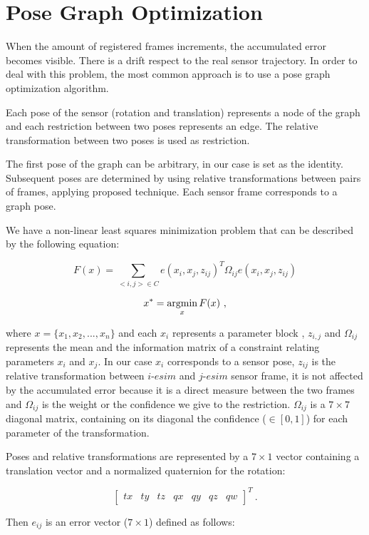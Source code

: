 \section{Pose Graph Optimization}
\label{sec:posegraph}
When the amount of registered frames increments, the accumulated error 
becomes visible. There is a drift respect to the real sensor trajectory. 
In order to deal with this problem, the most common approach is to use a pose graph 
optimization algorithm. 


Each pose of the sensor (rotation and translation) represents a node of the 
graph and each restriction between two poses represents an edge. The relative 
transformation between two poses is used as restriction.


The first pose of the graph can be arbitrary, in our case is set as the identity. Subsequent 
poses are determined by using relative transformations between pairs of frames, applying 
proposed technique. Each sensor frame corresponds to a graph pose. 

We have a non-linear least squares minimization problem that can be described by the following equation:

$$ F(x) = \sum\limits_{<i,j> \in C } e(x_i,x_j,z_{ij})^T \Omega_{ij} e(x_i,x_j,z_{ij}) $$

$$ x^* = \mathop{\rm argmin}_x F(x) \ ,$$

\noindent where $x=\{x_1,x_2,...,x_n\}$ and each $x_i$ represents a parameter block , $z_{i,j}$ and $\Omega_{ij}$ represents the mean  
 and the information matrix  of a constraint 
relating parameters $x_i$ and $x_j$. In our case $x_i$ corresponds to a sensor pose, $z_{ij}$ is the 
relative transformation between $i$-$esim$ and $j$-$esim$ sensor frame, it is not affected by the accumulated error 
because it is a direct measure between the two frames and $\Omega_{ij}$ is the weight or 
the confidence we give to the restriction. $\Omega_{ij}$ is a $7\times7$ diagonal matrix, containing on its diagonal the confidence ($\in [0,1]$) for each 
parameter of the transformation. 

Poses and relative transformations are represented by a $7\times1$ vector containing a translation vector
 and a normalized quaternion for the rotation:

$$ \begin{bmatrix} tx & ty & tz & qx & qy & qz & qw \end{bmatrix} ^T \ .$$



Then $e_{ij}$ is an error vector ($7\times1$) defined as follows:

